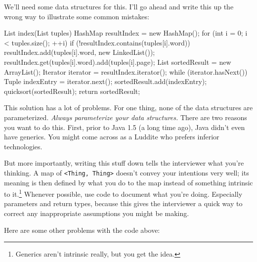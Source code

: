 \documentclass{article}
\begin{document}
      We'll need some data structures for this. I'll go ahead and write this up
      the wrong way to illustrate some common mistakes:

\begin{javacode}
List index(List tuples) {
  HashMap resultIndex = new HashMap();
  for (int i = 0; i < tuples.size(); ++i) {
    if (!resultIndex.contains(tuples[i].word))
      resultIndex.add(tuples[i].word, new LinkedList());
    resultIndex.get(tuples[i].word).add(tuples[i].page);
  }
  List sortedResult = new ArrayList();
  Iterator iterator = resultIndex.iterator();
  while (iterator.hasNext()) {
    Tuple indexEntry = iterator.next();
    sortedResult.add(indexEntry);
  }
  quicksort(sortedResult);
  return sortedResult;
} \end{javacode}

      This solution has a lot of problems. For one thing, none of the data
      structures are parameterized. {\em Always parameterize your data
      structures.} There are two reasons you want to do this. First, prior to
      Java 1.5 (a long time ago), Java didn't even have generics. You might
      come across as a Luddite who prefers inferior technologies.

      But more importantly, writing this stuff down tells the interviewer what
      you're thinking. A map of \verb|<Thing, Thing>| doesn't convey your
      intentions very well; its meaning is then defined by what you do to the
      map instead of something intrinsic to it.\footnote{Generics aren't
      intrinsic really, but you get the idea.} Whenever possible, use code to
      document what you're doing. Especially parameters and return types,
      because this gives the interviewer a quick way to correct any
      inappropriate assumptions you might be making.

      Here are some other problems with the code above:
\end{document}
